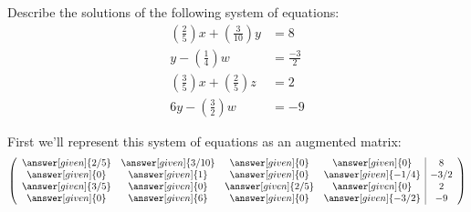 \documentclass{ximera}
\begin{document}
\begin{example}
  Describe the solutions of the following system of equations:
\begin{align*}
\left(\frac{2}{5}\right)x + \left(\frac{3}{10}\right) y &= 8\\
y -\left(\frac{1}{4}\right)w &= \frac{-3}{2}\\
\left(\frac{3}{5}\right)x + \left(\frac{2}{5}\right)z &= 2\\
6y - \left(\frac{3}{2}\right)w &= -9
\end{align*}
\begin{explanation}
First we'll represent this system of equations as an augmented matrix:
\[
  \left(
    \begin{array}{cccc|c}
      \answer[given]{2/5}&  \answer[given]{3/10} & \answer[given]{0} &\answer[given]{0} &8 \\
      \answer[given]{0}&  \answer[given]{1} & \answer[given]{0} &\answer[given]{-1/4} & -3/2\\
      \answer[given]{3/5}&  \answer[given]{0} & \answer[given]{2/5} &\answer[given]{0} &2\\
      \answer[given]{0}&  \answer[given]{6} & \answer[given]{0} &\answer[given]{-3/2} &-9
    \end{array}
  \right)
\]


\end{explanation}
\end{example}
\end{document}
